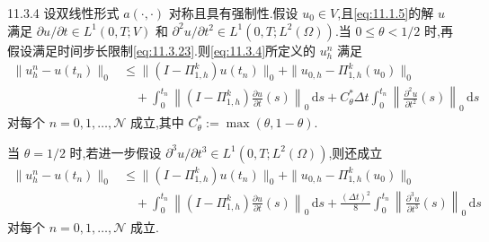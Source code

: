 \begin{theorem}[收敛性]{11.3.4}
设双线性形式 \(a(\cdot,\cdot)\) 对称且具有强制性.假设 \(u_0\in V\),且\eqref{eq:11.1.5}的解 \(u\) 满足 \(\partial u/\partial t\in L^1(0,T;V)\) 和 \(\partial^2u/\partial t^2\in L^1(0,T;L^2(\Omega))\).当 \(0\le\theta<1/2\) 时,再假设满足时间步长限制\eqref{eq:11.3.23}.则\eqref{eq:11.3.4}所定义的 \(u_h^n\) 满足
\begin{equation}\label{eq:11.3.30}
  \begin{aligned}
    \|u_h^n-u(t_n)\|_0
     &\le\|(I-\Pi_{1,h}^k)u(t_n)\|_0+\|u_{0,h}-\Pi_{1,h}^k(u_0)\|_0\\
     &\quad+\int_0^{t_n}\left\|(I-\Pi_{1,h}^k)
              \frac{\partial u}{\partial t}(s)\right\|_0\,\mathrm ds
      +C_\theta^*\Delta t\int_0^{t_n}
              \left\|\frac{\partial^2u}{\partial t^2}(s)\right\|_0\,\mathrm ds
  \end{aligned}
\end{equation}
对每个 \(n=0,1,\ldots,\mathcal N\) 成立,其中 \(C_\theta^*:=\max(\theta,1-\theta)\).

当 \(\theta=1/2\) 时,若进一步假设 \(\partial^3u/\partial t^3\in L^1(0,T;L^2(\Omega))\),则还成立
\begin{equation}\label{eq:11.3.31}
  \begin{aligned}
    \|u_h^n-u(t_n)\|_0
      &\le\|(I-\Pi_{1,h}^k)u(t_n)\|_0+\|u_{0,h}-\Pi_{1,h}^k(u_0)\|_0\\
      &\quad+\int_0^{t_n}\left\|(I-\Pi_{1,h}^k)
                   \frac{\partial u}{\partial t}(s)\right\|_0\,\mathrm ds
        +\frac{(\Delta t)^2}{8}\int_0^{t_n}
                   \left\|\frac{\partial^3u}{\partial t^3}(s)\right\|_0\,\mathrm ds
  \end{aligned}
\end{equation}
对每个 \(n=0,1,\ldots,\mathcal N\) 成立.
\end{theorem}

